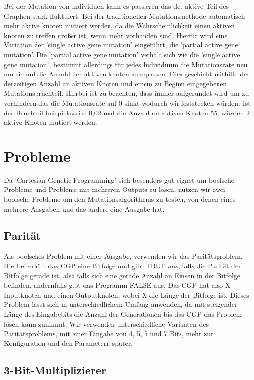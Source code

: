 Bei der Mutation von Individuen kann es passieren das der aktive Teil des Graphen stark fluktuiert. Bei der traditionellen Mutationsmethode automatisch mehr aktive knoten mutiert werden, da die Wahrscheinlichkeit einen aktiven knoten zu treffen größer ist, wenn mehr vorhanden sind. Hierfür wird eine Variation der 'single active gene mutation' eingeführt, die 'partial active gene mutation'. Die 'partial active gene mutation' verhält sich wie die 'single active gene mutation', bestimmt allerdings für jedes Individuum die Mutationsrate neu um sie auf die Anzahl der aktiven knoten anzupassen. Dies geschieht mithilfe der derzeitigen Anzahl an aktiven Knoten und einem zu Beginn eingegebenen Mutationsbruchteil. Hierbei ist zu beachten, dass immer aufgerundet wird um zu verhindern das die Mutationsrate auf 0 sinkt wodurch wir feststecken würden. Ist der Bruchteil beispielsweise 0,02 und die Anzahl an aktiven Knoten 55, würden 2 aktive Knoten mutiert werden.



\section{Probleme}

Da 'Cartesian Genetic Programming' sich besonders gut eignet um boolsche Probleme \cite{miller:1999:ACGP} und Probleme mit mehreren Outputs zu lösen, nutzen wir zwei boolsche Probleme um den Mutationsalgorithmus zu testen, von denen eines mehrere Ausgaben und das andere eine Ausgabe hat.

\subsection{Parität}

Als boolsches Problem mit einer Ausgabe, verwenden wir das Paritätsproblem. Hierbei erhält das CGP eine Bitfolge und gibt TRUE aus, falls die Parität der Bitfolge gerade ist, also falls sich eine gerade Anzahl an Einsen in der Bitfolge befinden, andernfalls gibt das Programm FALSE aus. Das CGP hat also X Inputknoten und einen Outputknoten, wobei X die Länge der Bitfolge ist. Dieses Problem lässt sich in unterschiedlichem Umfang anwenden, da mit steigender Länge des Eingabebits die Anzahl der Generationen bis das CGP das Problem lösen kann zunimmt. Wir verwenden unterschiedliche Varianten des Paritätsproblems, mit einer Eingabe von 4, 5, 6 und 7 Bits, mehr zur Konfiguration und den Parametern später.


\subsection{3-Bit-Multiplizierer}

